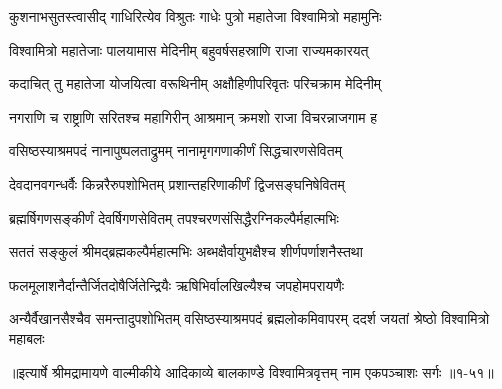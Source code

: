 \twolineshloka
{कुशनाभसुतस्त्वासीद् गाधिरित्येव विश्रुतः}
{गाधेः पुत्रो महातेजा विश्वामित्रो महामुनिः} %

\twolineshloka
{विश्वामित्रो महातेजाः पालयामास मेदिनीम्}
{बहुवर्षसहस्राणि राजा राज्यमकारयत्} %

\twolineshloka
{कदाचित् तु महातेजा योजयित्वा वरूथिनीम्}
{अक्षौहिणीपरिवृतः परिचक्राम मेदिनीम्} %

\twolineshloka
{नगराणि च राष्ट्राणि सरितश्च महागिरीन्}
{आश्रमान् क्रमशो राजा विचरन्नाजगाम ह} %

\twolineshloka
{वसिष्ठस्याश्रमपदं नानापुष्पलताद्रुमम्}
{नानामृगगणाकीर्णं सिद्धचारणसेवितम्} %

\twolineshloka
{देवदानवगन्धर्वैः किन्नरैरुपशोभितम्}
{प्रशान्तहरिणाकीर्णं द्विजसङ्घनिषेवितम्} %

\twolineshloka
{ब्रह्मर्षिगणसङ्कीर्णं देवर्षिगणसेवितम्}
{तपश्चरणसंसिद्धैरग्निकल्पैर्महात्मभिः} %

\twolineshloka
{सततं सङ्कुलं श्रीमद्ब्रह्मकल्पैर्महात्मभिः}
{अब्भक्षैर्वायुभक्षैश्च शीर्णपर्णाशनैस्तथा} %

\twolineshloka
{फलमूलाशनैर्दान्तैर्जितदोषैर्जितेन्द्रियैः}
{ऋषिभिर्वालखिल्यैश्च जपहोमपरायणैः} %

\threelineshloka
{अन्यैर्वैखानसैश्चैव समन्तादुपशोभितम्}
{वसिष्ठस्याश्रमपदं ब्रह्मलोकमिवापरम्}
{ददर्श जयतां श्रेष्ठो विश्वामित्रो महाबलः} %


॥इत्यार्षे श्रीमद्रामायणे वाल्मीकीये आदिकाव्ये बालकाण्डे विश्वामित्रवृत्तम् नाम एकपञ्चाशः सर्गः ॥१-५१॥
